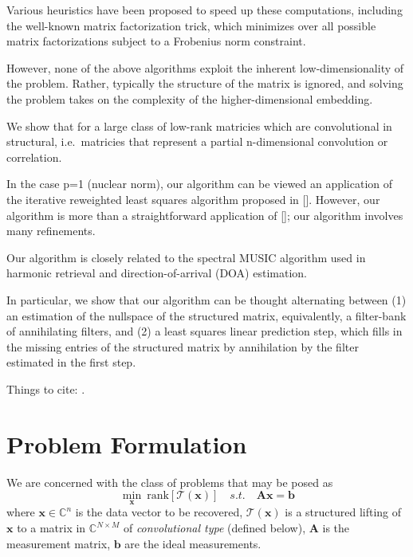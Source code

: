 \documentclass[10pt, twocolumn, twoside]{IEEEtran}
\newcommand{\mbf}{\mathbf}
\begin{document}
Various heuristics have been proposed to speed up these computations, including the well-known matrix factorization trick, which minimizes over all possible matrix factorizations subject to a Frobenius norm constraint.

However, none of the above algorithms exploit the inherent low-dimensionality of the problem. Rather, typically the structure of the matrix is ignored, and solving the problem takes on the complexity of the higher-dimensional embedding.

We show that for a large class of low-rank matricies which are convolutional in structural, i.e.\ matricies that represent a partial n-dimensional convolution or correlation.

In the case p=1 (nuclear norm), our algorithm can be viewed an application of the iterative reweighted least squares algorithm proposed in []. However, our algorithm is more than a straightforward application of []; our algorithm involves many refinements.

Our algorithm is closely related to the spectral MUSIC algorithm used in harmonic retrieval and direction-of-arrival (DOA) estimation.

In particular, we show that our algorithm can be thought alternating between (1) an estimation of the nullspace of the structured matrix, equivalently, a filter-bank of annihilating filters, and (2) a least squares linear prediction step, which fills in the missing entries of the structured matrix by annihilation by the filter estimated in the first step.

Things to cite: \cite{loraks,sake,xu2014precise,isbi2015,fazel2013hankel,mohan2012iterative}.

\section{Problem Formulation}
We are concerned with the class of problems that may be posed as
\[
\min_{\mbf x}~\text{rank}[\mathcal{T}(\mbf x)]\quad s.t.\quad \mbf A \mbf x = \mbf b
\]
where $\mbf x\in \mathbb{C}^n$ is the data vector to be recovered, $\mathcal{T}(\mbf x)$ is a structured lifting of $\mbf x$ to a matrix in $\mathbb{C}^{N\times M}$ of \emph{convolutional type} (defined below), $\mbf A$ is the measurement matrix, $\mbf b$ are the ideal measurements. 
\end{document}
